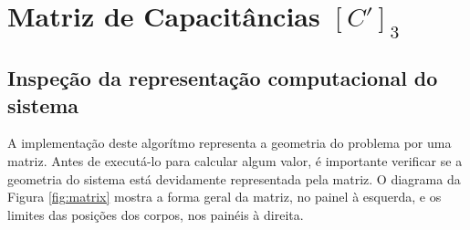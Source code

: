 \documentclass{aleph-revista}
\begin{document}
\membrete

\vspace{1em}


\section{Matriz de Capacitâncias $[C']_3$}

\subsection{Inspeção da representação computacional do sistema}
A implementação deste algorítmo representa a geometria do problema por uma matriz. Antes de executá-lo para calcular algum valor, é importante verificar se a geometria do sistema está devidamente representada pela matriz. O diagrama da Figura \ref{fig:matrix} mostra a forma geral da matriz, no painel à esquerda, e os limites das posições dos corpos, nos painéis à direita.
\end{document}
